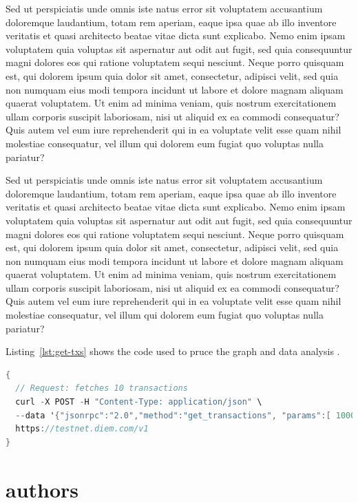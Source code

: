 \documentclass[10pt, conference, compsocconf]{IEEEtran}
\begin{document}
Sed ut perspiciatis unde omnis iste natus error sit voluptatem accusantium doloremque laudantium, totam rem aperiam, eaque ipsa quae ab illo inventore veritatis et quasi architecto beatae vitae dicta sunt explicabo. 
Nemo enim ipsam voluptatem quia voluptas sit aspernatur aut odit aut fugit, sed quia consequuntur magni dolores eos qui ratione voluptatem sequi nesciunt. Neque porro quisquam est, qui dolorem ipsum quia dolor sit amet, consectetur, adipisci velit, sed quia non numquam eius modi tempora incidunt ut labore et dolore magnam aliquam quaerat voluptatem. 
Ut enim ad minima veniam, quis nostrum exercitationem ullam corporis suscipit laboriosam, nisi ut aliquid ex ea commodi consequatur? Quis autem vel eum iure reprehenderit qui in ea voluptate velit esse quam nihil molestiae consequatur, vel illum qui dolorem eum fugiat quo voluptas nulla pariatur?

Sed ut perspiciatis unde omnis iste natus error sit voluptatem accusantium doloremque laudantium, totam rem aperiam, eaque ipsa quae ab illo inventore veritatis et quasi architecto beatae vitae dicta sunt explicabo. 
Nemo enim ipsam voluptatem quia voluptas sit aspernatur aut odit aut fugit, sed quia consequuntur magni dolores eos qui ratione voluptatem sequi nesciunt. Neque porro quisquam est, qui dolorem ipsum quia dolor sit amet, consectetur, adipisci velit, sed quia non numquam eius modi tempora incidunt ut labore et dolore magnam aliquam quaerat voluptatem. 
Ut enim ad minima veniam, quis nostrum exercitationem ullam corporis suscipit laboriosam, nisi ut aliquid ex ea commodi consequatur? Quis autem vel eum iure reprehenderit qui in ea voluptate velit esse quam nihil molestiae consequatur, vel illum qui dolorem eum fugiat quo voluptas nulla pariatur?


Listing~\ref{lst:get-txs} shows the code used to pruce the graph and data analysis . 

\begin{minipage}{0.95\linewidth}
\begin{lstlisting}[basicstyle=\tiny,language=C,frame=single,caption=JSON-RPC request to query the Diem DLT,label=lst:get-txs]
{
  // Request: fetches 10 transactions
  curl -X POST -H "Content-Type: application/json" \ 
  --data '{"jsonrpc":"2.0","method":"get_transactions", "params":[ 100000, 10, false ],"id":1}' \
  https://testnet.diem.com/v1
}
\end{lstlisting}
\end{minipage}

\section{authors}
\end{document}
